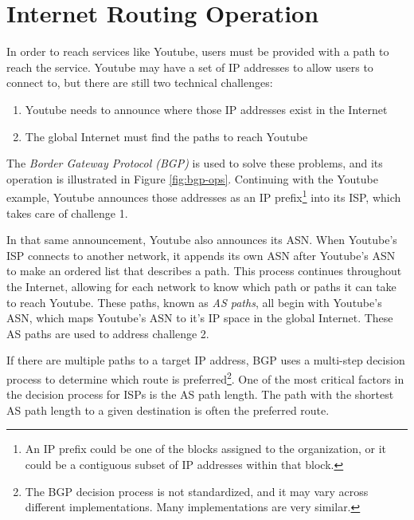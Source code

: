 \documentclass[conference]{IEEEtran}
\begin{document}
\section{Internet Routing Operation}
In order to reach services like Youtube, users must be provided with a path to reach the service.  Youtube may have a set of IP addresses to allow users to connect to, but there are still two technical challenges:
\begin{enumerate}
 \item Youtube needs to announce where those IP addresses exist in the Internet
 \item The global Internet must find the paths to reach Youtube
\end{enumerate}
The \emph{Border Gateway Protocol (BGP)} is used to solve these problems, and its operation is illustrated in Figure \ref{fig:bgp-ops}.  Continuing with the Youtube example, Youtube announces those addresses as an IP prefix\footnote{An IP prefix could be one of the blocks assigned to the organization, or it could be a contiguous subset of IP addresses within that block.} into its ISP, which takes care of challenge 1.

In that same announcement, Youtube also announces its ASN.  When Youtube's ISP connects to another network, it appends its own ASN after Youtube's ASN to make an ordered list that describes a path.  This process continues throughout the Internet, allowing for each network to know which path or paths it can take to reach Youtube.  These paths, known as \emph{AS paths}, all begin with Youtube's ASN, which maps Youtube's ASN to it's IP space in the global Internet.  These AS paths are used to address challenge 2.

If there are multiple paths to a target IP address, BGP uses a multi-step decision process to determine which route is preferred\footnote{The BGP decision process is not standardized, and it may vary across different implementations.  Many implementations are very similar.}.  One of the most critical factors in the decision process for ISPs is the AS path length.  The path with the shortest AS path length to a given destination is often the preferred route.
\end{document}
